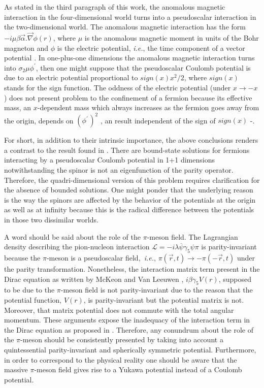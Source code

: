 \documentclass[a4paper,12pt,titlepage]{article}
\begin{document}
As stated in the third paragraph of this work, the anomalous magnetic
interaction in the four-dimensional world turns into a pseudoscalar
interaction in the two-dimensional world. The anomalous magnetic interaction
has the form $-i\mu \beta \vec{\alpha}.\vec{\nabla}\phi (r)$, where $\mu $
is the anomalous magnetic moment in units of the Bohr magneton and $\phi $
is the electric potential, \textit{i.e.}, the time component of a vector
potential \cite{tha}. In one-plus-one dimensions the anomalous magnetic
interaction turns into $\sigma _{2}\mu \phi ^{\prime }$, then one might
suppose that the pseudoscalar Coulomb potential is due to an electric
potential proportional to $sign(x)x^{2}/2$, where $sign(x)$ stands for the
sign function. The oddness of the electric potential (under $x\rightarrow -x$%
) does not present problem to the confinement of a fermion because its
effective mass, an $x$-dependent mass which always increases as the fermion
goes away from the origin, depends on $\left( \phi ^{\prime \,}\right) ^{2}$%
, an result independent of the sign of $sign(x)$ \cite{asc2}-\cite{asc3}.

For short, in addition to their intrinsic importance, the above conclusions
renders a contrast to the result found in \cite{mck}. There are bound-state
solutions for fermions interacting by a pseudoscalar Coulomb potential in
1+1 dimensions notwithstanding the spinor is not an eigenfunction of the
parity operator. Therefore, the quadri-dimensional version of this problem
requires clarification for the absence of bounded solutions. One might
ponder that the underlying reason is the way the spinors are affected by the
behavior of the potentials at the origin as well as at infinity because this
is the radical difference between the potentials in those two dissimilar
worlds.

A word should be said about the role of the $\pi $-meson field. The
Lagrangian density describing the pion-nucleon interaction $\mathcal{L}%
=-i\lambda \overline{\psi }\gamma _{5}\psi \pi $ is parity-invariant because
the $\pi $-meson is a pseudoscalar field,\textit{\ i.e.}, $\pi (\vec{r}%
,t)\rightarrow -\pi (-\vec{r},t)$ under the parity transformation.
Nonetheless, the interaction matrix term present in the Dirac equation as
written by McKeon and Van Leeuwen \cite{mck}, $i\beta \gamma _{5}V(r)$,
supposed to be due to the $\pi $-meson field is not parity-invariant due to
the reason that the potential function, $V(r)$, is parity-invariant but the
potential matrix is not. Moreover, that matrix potential does not commute
with the total angular momentum. These arguments expose the inadequacy of
the interaction term in the Dirac equation as proposed in \cite{mck}.
Therefore, any conundrum about the role of the $\pi $-meson should be
consistently presented  by taking into account a quintessential
parity-invariant and spherically symmetric potential. Furthermore, in order
to correspond to the physical reality one should be aware that the massive $%
\pi $-meson field gives rise to a Yukawa potential instead of a Coulomb
potential.
\end{document}
